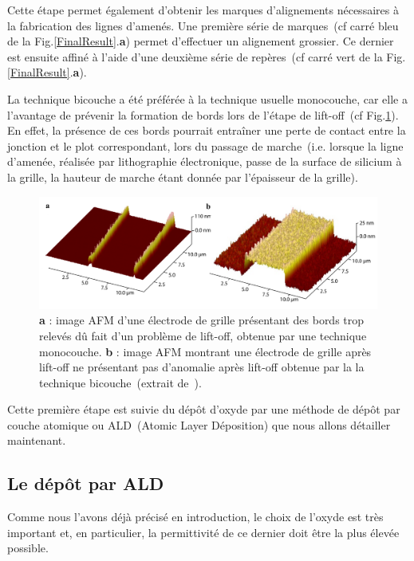 Cette étape permet également d'obtenir les marques d'alignements nécessaires à la fabrication des lignes d'amenés. Une première série de marques~(cf carré bleu de la Fig.\ref{FinalResult}.\textbf{a}) permet d'effectuer un alignement grossier. Ce dernier est ensuite affiné à l'aide d'une deuxième série de repères~(cf carré vert de la Fig.\ref{FinalResult}.\textbf{a}).

La technique bicouche a été préférée à la technique usuelle monocouche, car elle a l'avantage de prévenir la formation de bords lors de l'étape de lift-off~(cf Fig.\ref{lift-off}). En effet, la présence de ces bords pourrait entraîner une perte de contact entre la jonction et le plot correspondant, lors du passage de marche~(i.e. lorsque la ligne d'amenée, réalisée par lithographie électronique, passe de la surface de silicium à la grille, la hauteur de marche étant donnée par l'épaisseur de la grille).


\begin{figure}
\centering \includegraphics[scale=0.45]{Fabrication/BatmanGrille/BatmanGrille.pdf}
\caption{\textbf{a} : image AFM d'une électrode de grille présentant des bords trop relevés d\^u fait d'un problème de lift-off, obtenue par une technique monocouche. \textbf{b} : image AFM montrant une électrode de grille après lift-off ne présentant pas d'anomalie après lift-off obtenue par la la technique bicouche~(extrait de~\cite{RochPhd}).}
\label{lift-off}
\end{figure}

Cette première étape est suivie du dépôt d'oxyde par une méthode de dépôt par couche atomique ou ALD~(Atomic Layer Déposition) que nous allons détailler maintenant.

\subsection{Le dép\^ot par ALD}

Comme nous l'avons déjà précisé en introduction, le choix de l'oxyde est très important et, en particulier, la permittivité de ce dernier doit être la plus élevée possible.

